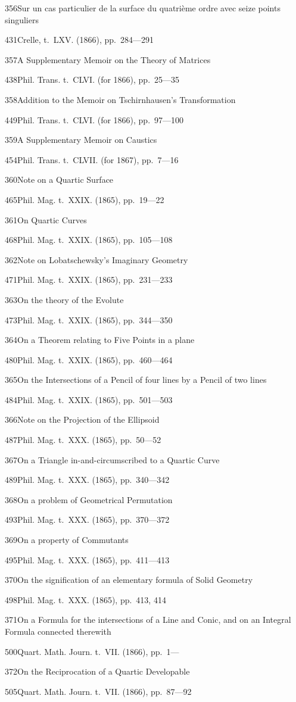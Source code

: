 \documentclass[11pt,a4paper]{book}
\providecommand{\tocentry}[2]{#1\dotfill #2\par}
\begin{document}
\tocentry{356}{Sur un cas particulier de la surface du quatri\`{e}me ordre avec seize points singuliers}{431}{Crelle, t.~LXV. (1866), pp.~284---291}

\tocentry{357}{A Supplementary Memoir on the Theory of Matrices}{438}{Phil. Trans. t.~CLVI. (for 1866), pp.~25---35}

\tocentry{358}{Addition to the Memoir on Tschirnhausen's Transformation}{449}{Phil. Trans. t.~CLVI. (for 1866), pp.~97---100}

\tocentry{359}{A Supplementary Memoir on Caustics}{454}{Phil. Trans. t.~CLVII. (for 1867), pp.~7---16}

\tocentry{360}{Note on a Quartic Surface}{465}{Phil. Mag. t.~XXIX. (1865), pp.~19---22}

\tocentry{361}{On Quartic Curves}{468}{Phil. Mag. t.~XXIX. (1865), pp.~105---108}

\tocentry{362}{Note on Lobatschewsky's Imaginary Geometry}{471}{Phil. Mag. t.~XXIX. (1865), pp.~231---233}

\tocentry{363}{On the theory of the Evolute}{473}{Phil. Mag. t.~XXIX. (1865), pp.~344---350}

\tocentry{364}{On a Theorem relating to Five Points in a plane}{480}{Phil. Mag. t.~XXIX. (1865), pp.~460---464}

\tocentry{365}{On the Intersections of a Pencil of four lines by a Pencil of two lines}{484}{Phil. Mag. t.~XXIX. (1865), pp.~501---503}

\tocentry{366}{Note on the Projection of the Ellipsoid}{487}{Phil. Mag. t.~XXX. (1865), pp.~50---52}

\newpage

\tocentry{367}{On a Triangle in-and-circumscribed to a Quartic Curve}{489}{Phil. Mag. t.~XXX. (1865), pp.~340---342}

\tocentry{368}{On a problem of Geometrical Permutation}{493}{Phil. Mag. t.~XXX. (1865), pp.~370---372}

\tocentry{369}{On a property of Commutants}{495}{Phil. Mag. t.~XXX. (1865), pp.~411---413}

\tocentry{370}{On the signification of an elementary formula of Solid Geometry}{498}{Phil. Mag. t.~XXX. (1865), pp.~413, 414}

\tocentry{371}{On a Formula for the intersections of a Line and Conic, and on an Integral Formula connected therewith}{500}{Quart. Math. Journ. t.~VII. (1866), pp.~1---}

\tocentry{372}{On the Reciprocation of a Quartic Developable}{505}{Quart. Math. Journ. t.~VII. (1866), pp.~87---92}
\end{document}
